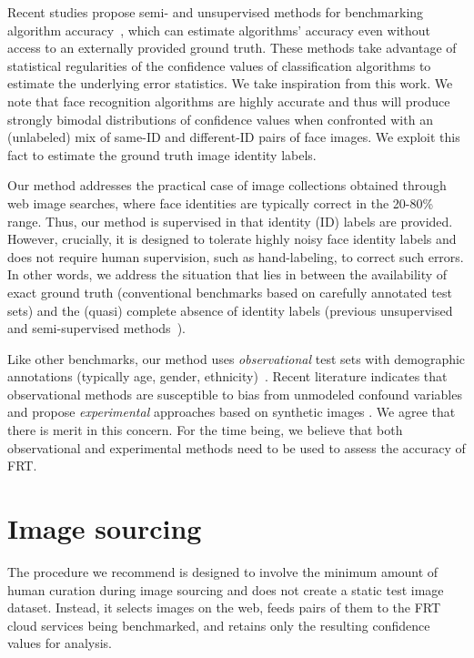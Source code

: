\documentclass[10pt,twocolumn,letterpaper]{article}
\begin{document}
Recent studies propose semi- and unsupervised methods for benchmarking algorithm accuracy~\cite{welinder2013lazy,ji2020can,chouldechova2022unsupervised}, which can estimate algorithms' accuracy even without access to an externally provided ground truth. These methods take advantage of statistical regularities of the confidence values of classification algorithms to estimate the underlying error statistics. We take inspiration from this work. We note that face recognition algorithms are highly accurate and thus will produce strongly bimodal distributions of confidence values when confronted with an (unlabeled) mix of same-ID and different-ID pairs of face images. We exploit this fact to estimate the ground truth image identity labels. 

Our method addresses the practical case of image collections obtained through web image searches, where face identities are typically correct in the 20-80\% range. Thus, our method is supervised in that identity (ID) labels are provided. However, crucially, it is designed to tolerate highly noisy face identity labels and does not require human supervision, such as hand-labeling, to correct such errors. In other words, we address the situation that lies in between the availability of exact ground truth (conventional benchmarks based on carefully annotated test sets) and the (quasi) complete absence of identity labels (previous unsupervised and semi-supervised methods~\cite{welinder2013lazy,chouldechova2022unsupervised}). 

 Like other benchmarks, our method uses {\em observational} test sets with demographic annotations (typically age, gender, ethnicity)~\cite{ricanek2006morph,liu2015deep,grother2019face,karkkainen2021fairface}. Recent literature indicates that observational methods are susceptible to bias from unmodeled confound variables and propose {\em experimental} approaches based on synthetic images \cite{balakrishnan2021towards,liang2023benchmarking}. We agree that there is merit in this concern. For the time being, we believe that both observational and experimental methods need to be used to assess the accuracy of FRT.

\section{Image sourcing} 
\label{sec:image-sourcing}

The procedure we recommend is designed to involve the minimum amount of human curation during image sourcing and does not create a static test image dataset. Instead, it selects images on the web, feeds pairs of them to the FRT cloud services being benchmarked, and retains only the resulting confidence values for analysis.
\end{document}
